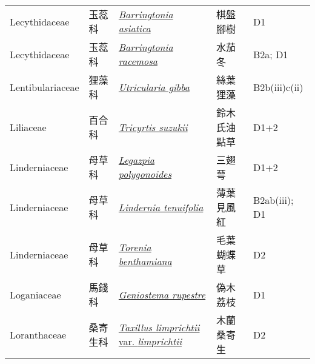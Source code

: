 {\begin{longtable}{p{2.5cm}p{2cm}p{5cm}p{2.5cm}p{3cm}}
    Lecythidaceae & 玉蕊科 & \href{http://www.theplantlist.org/tpl1.1/search?q=Barringtonia+asiatica}{\textit{Barringtonia asiatica} } & 棋盤腳樹 & D1 \index{Barringtonia@\textit{Barringtonia}!asiatica@\textit{asiatica}}  \index{棋盤腳樹} \\
    Lecythidaceae & 玉蕊科 & \href{http://www.theplantlist.org/tpl1.1/search?q=Barringtonia+racemosa}{\textit{Barringtonia racemosa} } & 水茄冬 & B2a; D1 \index{Barringtonia@\textit{Barringtonia}!racemosa@\textit{racemosa}}  \index{水茄冬} \\
    Lentibulariaceae & 狸藻科 & \href{http://www.theplantlist.org/tpl1.1/search?q=Utricularia+gibba}{\textit{Utricularia gibba} } & 絲葉狸藻 & B2b(iii)c(ii) \index{Utricularia@\textit{Utricularia}!gibba@\textit{gibba}}  \index{絲葉狸藻} \\
    Liliaceae & 百合科 & \href{http://www.theplantlist.org/tpl1.1/search?q=Tricyrtis+suzukii}{\textit{Tricyrtis suzukii} } & 鈴木氏油點草 & D1+2 \index{Tricyrtis@\textit{Tricyrtis}!suzukii@\textit{suzukii}}  \index{鈴木氏油點草} \\
    Linderniaceae & 母草科 & \href{http://www.theplantlist.org/tpl1.1/search?q=Legazpia+polygonoides}{\textit{Legazpia polygonoides} } & 三翅萼 & D1+2 \index{Legazpia@\textit{Legazpia}!polygonoides@\textit{polygonoides}}  \index{三翅萼} \\
    Linderniaceae & 母草科 & \href{http://www.theplantlist.org/tpl1.1/search?q=Lindernia+tenuifolia}{\textit{Lindernia tenuifolia} } & 薄葉見風紅 & B2ab(iii); D1 \index{Lindernia@\textit{Lindernia}!tenuifolia@\textit{tenuifolia}}  \index{薄葉見風紅} \\
    Linderniaceae & 母草科 & \href{http://www.theplantlist.org/tpl1.1/search?q=Torenia+benthamiana}{\textit{Torenia benthamiana} } & 毛葉蝴蝶草 & D2 \index{Torenia@\textit{Torenia}!benthamiana@\textit{benthamiana}}  \index{毛葉蝴蝶草} \\
    Loganiaceae & 馬錢科 & \href{http://www.theplantlist.org/tpl1.1/search?q=Geniostema+rupestre}{\textit{Geniostema rupestre} } & 偽木荔枝 & D1 \index{Geniostema@\textit{Geniostema}!rupestre@\textit{rupestre}}  \index{偽木荔枝} \\
    Loranthaceae & 桑寄生科 & \href{http://www.theplantlist.org/tpl1.1/search?q=Taxillus+limprichtii+var.+limprichtii}{\textit{Taxillus limprichtii} var. \textit{limprichtii} } & 木蘭桑寄生 & D2 \index{Taxillus@\textit{Taxillus}!limprichtii@\textit{limprichtii}!var. limprichtii@var. \textit{limprichtii}}  \index{木蘭桑寄生} \\

\end{longtable}}
